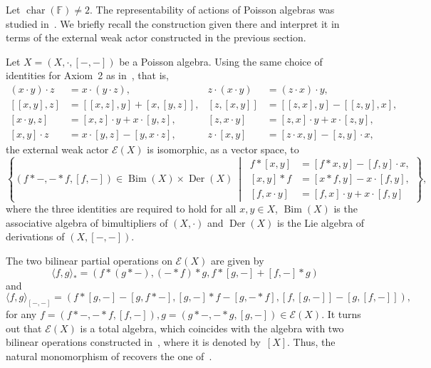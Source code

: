 \documentclass[reqno,a4paper]{amsart}
\theoremstyle{plain}
\theoremstyle{definition}
\theoremstyle{remark}
\numberwithin{equation}{section}
\newcommand{\F}{\mathbb{F}}
\newcommand{\E}{\mathcal{E}}
\DeclareMathOperator{\bchar}{char}
\DeclareMathOperator{\Bim}{Bim}
\DeclareMathOperator{\Der}{Der}
\begin{document}
Let $\bchar(\F) \neq 2$. The representability of actions of Poisson algebras was studied in~\cite[Section~5]{CigoliManciniMetere}. We briefly recall the construction given there and interpret it in terms of the external weak actor constructed in the previous section.

Let $X=(X,\cdot,[-,-])$ be a Poisson algebra. Using the same choice of identities for Axiom~2 as in~\cite{CigoliManciniMetere}, that is,
\begin{align*}
(x\cdot y)\cdot z&=x\cdot(y\cdot z), &
z\cdot(x\cdot y)&=(z\cdot x)\cdot y,\\
[[x,y],z]&=[[x,z],y]+[x,[y,z]], &
[z,[x,y]]&=[[z,x],y]-[[z,y],x],\\
[x\cdot y,z]&=[x,z]\cdot y+x\cdot[y,z], &
[z,x\cdot y]&=[z,x]\cdot y+x\cdot[z,y],\\
[x,y]\cdot z&=x\cdot[y,z]-[y,x\cdot z], &
z\cdot[x,y]&=[z\cdot x,y]-[z,y]\cdot x,
\end{align*}
the external weak actor $\E(X)$ is isomorphic, as a vector space, to
\[
\left\{
(f \ast -, - \ast f,[f,-])\in\Bim(X)\times\Der(X)
\ \middle|\
\begin{aligned}
f \ast [x,y]&=[f \ast x,y]-[f,y]\cdot x,\\
[x,y] \ast f&=[x \ast f,y]-x\cdot [f,y],\\
[f,x \cdot y]&=[f,x] \cdot y+x \cdot [f,y]
\end{aligned}
\right\},
\]
where the three identities are required to hold for all $x,y\in X$, $\Bim(X)$ is the associative algebra of bimultipliers of $(X,\cdot)$ and $\Der(X)$ is the Lie algebra of derivations of $(X,[-,-])$.

The two bilinear partial operations on $\E(X)$ are given by
\[
\langle f,g\rangle_\ast=(f \ast (g \ast -), (- \ast f) \ast g, f \ast [g,-] + [f,-] \ast g)
\]
and
\[
\langle f,g\rangle_{[-,-]}=(f \ast [g,-] - [g,f \ast -], [g,-] \ast f - [g,- \ast f], [f,[g,-]]-[g,[f,-]]),
\]
for any $f=(f \ast -, - \ast f,[f,-]), g=(g \ast -, - \ast g,[g,-]) \in \E(X)$. It turns out that $\E(X)$ is a total algebra, which coincides with the algebra with two bilinear operations constructed in~\cite[Theorem~5.6]{CigoliManciniMetere}, where it is denoted by~$[X]$. Thus, the natural monomorphism of  recovers the one of~\cite[Theorem~5.6]{CigoliManciniMetere}.
\end{document}
